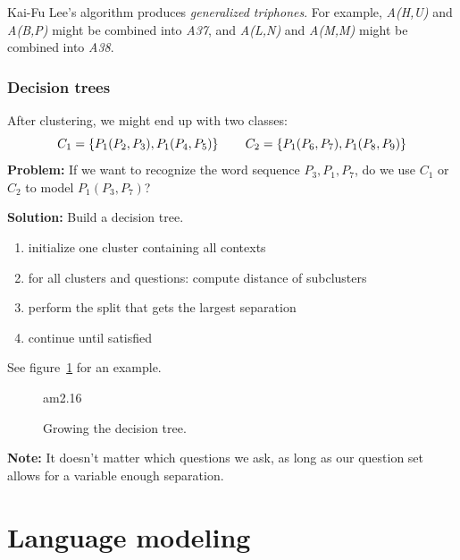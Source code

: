 \documentclass[11pt]{article}
\begin{document}
Kai-Fu Lee's algorithm produces \textit{generalized triphones}. For example, \textit{A(H,U)} and \textit{A(B,P)} might be combined into \textit{A37}, and \textit{A(L,N)} and \textit{A(M,M)} might be combined into \textit{A38}.

\subsubsection{Decision trees}

After clustering, we might end up with two classes:
\[
    C_1 = \left\{P_1(P_2, P_3), P_1(P_4, P_5) \right\} \mbox{\hspace{20pt}} C_2 = \left\{P_1(P_6, P_7), P_1(P_8, P_9) \right\}
\]
\textbf{Problem:} If we want to recognize the word sequence $P_3, P_1, P_7$, do we use $C_1$ or $C_2$ to model $P_1(P_3, P_7)$?

\vspace{5pt}

\textbf{Solution:} Build a decision tree.

\vspace{10pt}

\begin{enumerate}
    \item initialize one cluster containing all contexts
    \item for all clusters and questions: compute distance of subclusters
    \item perform the split that gets the largest separation
    \item continue until satisfied
\end{enumerate}

See figure~\ref{fig:growDecisionTree} for an example.

\begin{figure}[htb]
    \begin{minipage}{\linewidth}
        \vspace{5cm}
        \hfill \scriptsize am2.16
    \end{minipage}
    \caption{\label{fig:growDecisionTree} Growing the decision tree.}
\end{figure}

\textbf{Note:} It doesn't matter which questions we ask, as long as our question set allows for a variable enough separation.

\section{Language modeling}
\end{document}
